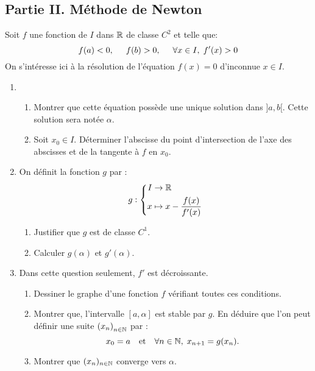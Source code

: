 \subsection*{Partie II. Méthode de Newton}
Soit $f$ une fonction de $I$ dans $\mathbb{R}$ de classe $C^2$ et telle que:
\begin{displaymath}
f(a)<0,\hspace{0.5cm} f(b)>0,\hspace{0.5cm} \forall x\in I,\; f'(x)>0   
\end{displaymath}
On s'intéresse ici à la résolution de l'équation $f(x)=0$ d'inconnue $x\in I$.
\begin{enumerate}
  \item 
    \begin{enumerate}
       \item Montrer que cette équation possède une unique solution dans $]a,b[$. Cette solution sera notée $\alpha$.
       \item Soit $x_0\in I$. Déterminer l'abscisse du point d'intersection de l'axe des abscisses et de la tangente à $f$ en $x_0$.
    \end{enumerate}
  \item On définit la fonction $g$ par :
  \begin{displaymath}
  g:
\left\lbrace 
\begin{aligned}
  I &\rightarrow \mathbb{R} \\
  x &\mapsto x-\frac{f(x)}{f'(x)}
\end{aligned}
\right. 
\end{displaymath}
  \begin{enumerate}
    \item Justifier que $g$ est de classe $C^1$.
    \item Calculer $g(\alpha)$ et $g'(\alpha)$.
  \end{enumerate}
  \item Dans cette question seulement, $f'$ est décroissante.
  \begin{enumerate}
     \item Dessiner le graphe d'une fonction $f$ vérifiant toutes ces conditions.
     \item Montrer que, l'intervalle $\left[ a, \alpha \right]$ est stable par $g$. En déduire que l'on peut définir une suite $\left( x_n \right)_{n \in \mathbb{N}}$ par :
\[
 x_0=a\quad\text{et}\quad \forall n \in \mathbb{N},\; x_{n+1} = g(x_n).
\]
      \item Montrer que $(x_n)_{n\in \mathbb{N}}$ converge vers $\alpha$.
  \end{enumerate}

\end{enumerate}
